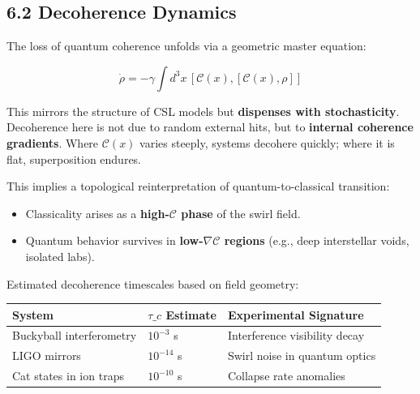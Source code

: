 \documentclass[
  11pt,
]{article}
\providecommand{\tightlist}{%
  \setlength{\itemsep}{0pt}\setlength{\parskip}{0pt}}
\begin{document}
\subsection{6.2 Decoherence Dynamics}\label{decoherence-dynamics}

The loss of quantum coherence unfolds via a geometric master equation:

\[
\dot{\rho} = -\gamma \int d^3x \, [\mathcal{C}(x), [\mathcal{C}(x), \rho]]
\]

This mirrors the structure of CSL models but \textbf{dispenses with
stochasticity}. Decoherence here is not due to random external hits, but
to \textbf{internal coherence gradients}. Where \(\mathcal{C}(x)\)
varies steeply, systems decohere quickly; where it is flat,
superposition endures.

This implies a topological reinterpretation of quantum-to-classical
transition:

\begin{itemize}
\tightlist
\item
  Classicality arises as a \textbf{high-\(\mathcal{C}\) phase} of the
  swirl field.
\item
  Quantum behavior survives in \textbf{low-\(\nabla \mathcal{C}\)
  regions} (e.g., deep interstellar voids, isolated labs).
\end{itemize}

Estimated decoherence timescales based on field geometry:

\begin{longtable}[]{@{}
  >{\raggedright\arraybackslash}p{}
  >{\raggedright\arraybackslash}p{}
  >{\raggedright\arraybackslash}p{}@{}}
\toprule\noalign{}
\begin{minipage}[b]{\linewidth}\raggedright
System
\end{minipage} & \begin{minipage}[b]{\linewidth}\raggedright
\(\tau\_c\) Estimate
\end{minipage} & \begin{minipage}[b]{\linewidth}\raggedright
Experimental Signature
\end{minipage} \\
\midrule\noalign{}
\endhead
\bottomrule\noalign{}
\endlastfoot
Buckyball interferometry & \(10^{-3}\) s & Interference visibility
decay \\
LIGO mirrors & \(10^{-14}\) s & Swirl noise in quantum optics \\
Cat states in ion traps & \(10^{-10}\) s & Collapse rate anomalies \\
\end{longtable}
\end{document}
